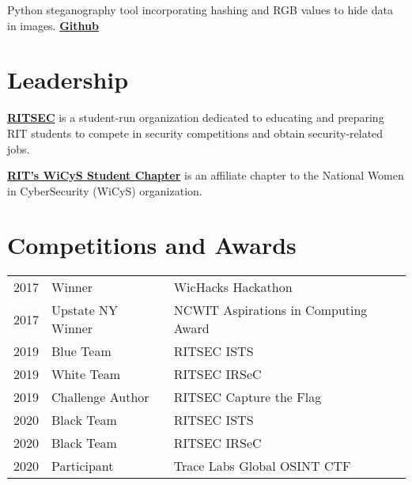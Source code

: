 \documentclass[]{deedy-resume-openfont}
\begin{document}
\begin{minipage}[t]{0.66\textwidth}
Python steganography tool incorporating hashing and RGB values to hide data in images. \textbf{\href{https://github.com/amvisca32/stegosaurus}{Github}}
\sectionsep


\section{Leadership}
\textbf{\href{https://www.ritsec.club/}{RITSEC}} is a student-run organization dedicated to educating and preparing RIT students to compete in security competitions and obtain security-related jobs. 

\textbf{\href{https://wicysrit.weebly.com/}{RIT's WiCyS Student Chapter}} is an affiliate chapter to the National Women in CyberSecurity (WiCyS) organization. 
\sectionsep


\section{Competitions and Awards} 
\begin{tabular}{rll}
2017	 & Winner  & WicHacks Hackathon\\
2017     & Upstate NY Winner  & NCWIT Aspirations in Computing Award \\
2019	 & Blue Team  & RITSEC ISTS\\
2019	 & White Team  & RITSEC IRSeC\\
2019     & Challenge Author & RITSEC Capture the Flag  \\
2020     & Black Team & RITSEC ISTS \\
2020     & Black Team & RITSEC IRSeC \\
2020     & Participant & Trace Labs Global OSINT CTF
\end{tabular}
\sectionsep

\end{minipage} 
\end{document}
